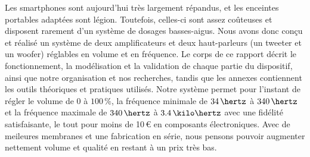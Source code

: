{
%
%
    Les smartphones sont aujourd'hui très largement répandus,
    et les enceintes portables adaptées sont légion.
    Toutefois, celles-ci sont assez coûteuses et disposent rarement
    d'un système de dosages basses-aigus.
    Nous avons donc conçu et réalisé un système de deux amplificateurs
    et deux haut-parleurs (un tweeter et un woofer)
    réglables en volume et en fréquence.
    Le corps de ce rapport décrit le fonctionnement, la modélisation
    et la validation de chaque partie du dispositif,
    ainsi que notre organisation et nos recherches, tandis que
    les annexes contiennent les outils théoriques et pratiques utilisés.
    Notre système permet pour l'instant de régler le volume
    de 0 à $100\,\%$, la fréquence minimale de $34\,\hertz$ à $340\,\hertz$
    et la fréquence maximale de $340\,\hertz$ à $3.4\,\kilo\hertz$
    avec une fidélité satisfaisante, le tout pour moins de 10\,\euro{}
    en composants électroniques.
    Avec de meileures membranes et une fabrication en série,
    nous pensons pouvoir augmenter nettement volume et qualité
    en restant à un prix très bas.
}
